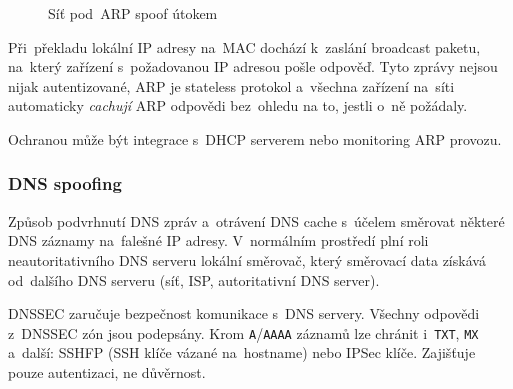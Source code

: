 \begin{figure}[ht]
\centering
{}
\caption*{Síť pod~ARP spoof útokem}
\end{figure}

Při~překladu lokální IP adresy na~MAC dochází k~zaslání broadcast paketu, na~který zařízení s~požadovanou IP adresou pošle odpověď. Tyto zprávy nejsou nijak autentizované, ARP je stateless protokol a~všechna zařízení na~síti automaticky \emph{cachují} ARP odpovědi bez~ohledu na to, jestli o~ně požádaly.

Ochranou může být integrace s~DHCP serverem nebo monitoring ARP provozu.

\subsubsection{DNS spoofing}

Způsob podvrhnutí DNS zpráv a~otrávení DNS cache s~účelem směrovat některé DNS záznamy na~falešné IP adresy. V~normálním prostředí plní roli neautoritativního DNS serveru lokální směrovač, který směrovací data získává od~dalšího DNS serveru (síť, ISP, autoritativní DNS server).

DNSSEC zaručuje bezpečnost komunikace s~DNS servery. Všechny odpovědi z~DNSSEC zón jsou podepsány. Krom \texttt{A}/\texttt{AAAA} záznamů lze chránit i~\texttt{TXT}, \texttt{MX} a~další: SSHFP (SSH klíče vázané na~hostname) nebo IPSec klíče. Zajišťuje pouze autentizaci, ne důvěrnost.

